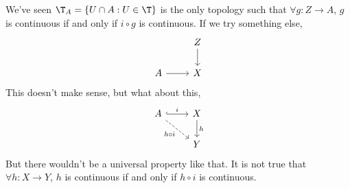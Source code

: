 We've seen $\T_A = \{U \cap A : U \in \T\}$ is the only topology such that $\forall g : Z \to A$, $g$ is continuous if and only if $i \circ g$ is continuous. If we try something else,
\[\begin{tikzcd}
	& Z \\
	A & X
	\arrow[from=1-2, to=2-2]
	\arrow[from=2-1, to=2-2]
\end{tikzcd}\]
This doesn't make sense, but what about this,
\[\begin{tikzcd}
	A & X \\
	& Y
	\arrow["i", hook, from=1-1, to=1-2]
	\arrow["h", from=1-2, to=2-2]
	\arrow["{h \circ i}"', dashed, from=1-1, to=2-2]
\end{tikzcd}\]
But there wouldn't be a universal property like that. It is not true that $\forall h : X \to Y$, $h$ is continuous if and only if $h \circ i$ is continuous.